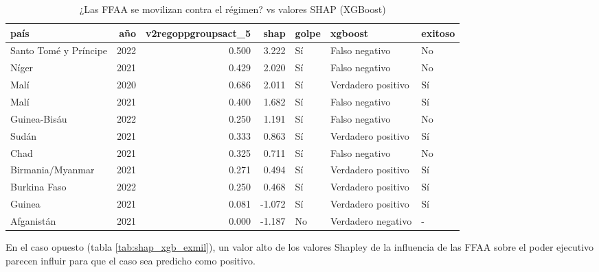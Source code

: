 \documentclass{article}
\begin{document}
  \begin{table}[H]
    \centering
    \begin{tabular}{lrrrlll}
      \toprule
      país & año & v2regoppgroupsact\_5 & shap & golpe & xgboost & exitoso \\
      \midrule
      Santo Tomé y Príncipe & 2022 & 0.500 & 3.222 & Sí & Falso negativo & No \\
      Níger & 2021 & 0.429 & 2.020 & Sí & Falso negativo & No \\
      Malí & 2020 & 0.686 & 2.011 & Sí & Verdadero positivo & Sí \\
      Malí & 2021 & 0.400 & 1.682 & Sí & Falso negativo & Sí \\
      Guinea-Bisáu & 2022 & 0.250 & 1.191 & Sí & Falso negativo & No \\
      Sudán & 2021 & 0.333 & 0.863 & Sí & Verdadero positivo & Sí \\
      Chad & 2021 & 0.325 & 0.711 & Sí & Falso negativo & No \\
      Birmania/Myanmar & 2021 & 0.271 & 0.494 & Sí & Verdadero positivo & Sí \\
      Burkina Faso & 2022 & 0.250 & 0.468 & Sí & Verdadero positivo & Sí \\
      Guinea & 2021 & 0.081 & -1.072 & Sí & Verdadero positivo & Sí \\
      Afganistán & 2021 & 0.000 & -1.187 & No & Verdadero negativo & - \\
      \bottomrule
    \end{tabular}
    \caption{¿Las FFAA se movilizan contra el régimen? vs valores SHAP (XGBoost) \label{tab:shap_xgb_regopp}}
  \end{table}

  En el caso opuesto (tabla \ref{tab:shap_xgb_exmil}), un valor alto de los valores 
  Shapley de la influencia de las FFAA sobre el poder ejecutivo parecen influir para 
  que el caso sea predicho como positivo.
\end{document}
